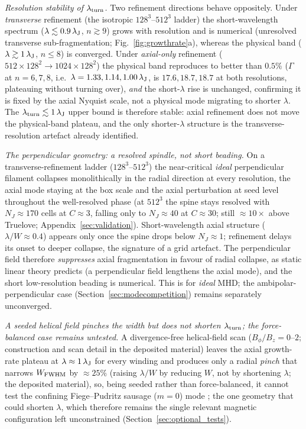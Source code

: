 \documentclass[usenatbib,twoside,twocolumn]{mnras}
\begin{document}
\emph{Resolution stability of $\lambda_{\rm turn}$.} Two refinement directions behave oppositely. Under \emph{transverse} refinement (the isotropic $128^3$--$512^3$ ladder) the short-wavelength spectrum ($\lambda\lesssim0.9\,\lambda_{\rm J}$, $n\gtrsim9$) grows with resolution and is numerical (unresolved transverse sub-fragmentation; Fig.~\ref{fig:growthrate}a), whereas the physical band ($\lambda\gtrsim1\,\lambda_{\rm J}$, $n\leq8$) is converged. Under \emph{axial-only} refinement ($512\times128^2\to1024\times128^2$) the physical band reproduces to better than $0.5\%$ ($\Gamma$ at $n=6,7,8$, i.e.\ $\lambda=1.33,1.14,1.00\,\lambda_{\rm J}$, is $17.6,18.7,18.7$ at both resolutions, plateauing without turning over), \emph{and} the short-$\lambda$ rise is unchanged, confirming it is fixed by the axial Nyquist scale, not a physical mode migrating to shorter $\lambda$. The $\lambda_{\rm turn}\lesssim1\,\lambda_{\rm J}$ upper bound is therefore stable: axial refinement does not move the physical-band plateau, and the only shorter-$\lambda$ structure is the transverse-resolution artefact already identified.

\emph{The perpendicular geometry: a resolved spindle, not short beading.} On a transverse-refinement ladder ($128^3$--$512^3$) the near-critical \emph{ideal} perpendicular filament collapses monolithically in the radial direction at every resolution, the axial mode staying at the box scale and the axial perturbation at seed level throughout the well-resolved phase (at $512^3$ the spine stays resolved with $N_J\approx170$ cells at $C\approx3$, falling only to $N_J\approx40$ at $C\approx30$; still $\approx10\times$ above Truelove; Appendix~\ref{sec:validation}). Short-wavelength axial structure ($\lambda/W\approx0.4$) appears only once the spine drops below $N_J\approx1$; refinement delays its onset to deeper collapse, the signature of a grid artefact. The perpendicular field therefore \emph{suppresses} axial fragmentation in favour of radial collapse, as static linear theory predicts (a perpendicular field lengthens the axial mode), and the short low-resolution beading is numerical. This is for \emph{ideal} MHD; the ambipolar-perpendicular case (Section~\ref{sec:modecompetition}) remains separately unconverged.

\emph{A seeded helical field pinches the width but does not shorten $\lambda_{\rm turn}$; the force-balanced case remains untested.} A divergence-free helical-field scan ($B_\phi/B_z=0$--$2$; construction and scan detail in the deposited material) leaves the axial growth-rate plateau at $\lambda\approx1\,\lambda_{\rm J}$ for every winding and produces only a radial \emph{pinch} that narrows $W_{\rm FWHM}$ by $\approx25\%$ (raising $\lambda/W$ by reducing $W$, not by shortening $\lambda$; the deposited material), so, being seeded rather than force-balanced, it cannot test the confining Fiege--Pudritz sausage ($m=0$) mode \citep{Fiege2000}; the one geometry that could shorten $\lambda$, which therefore remains the single relevant magnetic configuration left unconstrained (Section~\ref{sec:optional_tests}).
\end{document}
